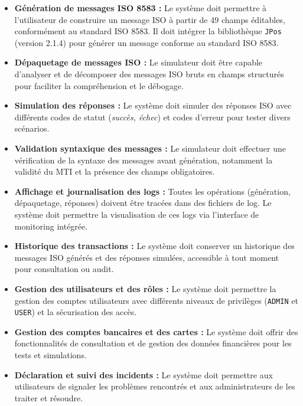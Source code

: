 \begin{itemize}[label=\textbullet]
    \item \textbf{Génération de messages ISO 8583 :} Le système doit permettre à l'utilisateur de construire un message ISO à partir de 49 champs éditables, conformément au standard ISO 8583. Il doit intégrer la bibliothèque \texttt{JPos} (version 2.1.4) pour générer un message conforme au standard ISO 8583.
    
    \item \textbf{Dépaquetage de messages ISO :} Le simulateur doit être capable d'analyser et de décomposer des messages ISO bruts en champs structurés pour faciliter la compréhension et le débogage.
    
    \item \textbf{Simulation des réponses :} Le système doit simuler des réponses ISO avec différents codes de statut (\textit{succès, échec}) et codes d'erreur pour tester divers scénarios.
    
    \item \textbf{Validation syntaxique des messages :} Le simulateur doit effectuer une vérification de la syntaxe des messages avant génération, notamment la validité du MTI et la présence des champs obligatoires.
    
    \item \textbf{Affichage et journalisation des logs :} Toutes les opérations (génération, dépaquetage, réponses) doivent être tracées dans des fichiers de log. Le système doit permettre la visualisation de ces logs via l'interface de monitoring intégrée.
    
    \item \textbf{Historique des transactions :} Le système doit conserver un historique des messages ISO générés et des réponses simulées, accessible à tout moment pour consultation ou audit.
    
    \item \textbf{Gestion des utilisateurs et des rôles :} Le système doit permettre la gestion des comptes utilisateurs avec différents niveaux de privilèges (\texttt{ADMIN} et \texttt{USER}) et la sécurisation des accès.
    
    \item \textbf{Gestion des comptes bancaires et des cartes :} Le système doit offrir des fonctionnalités de consultation et de gestion des données financières pour les tests et simulations.
    
    \item \textbf{Déclaration et suivi des incidents :} Le système doit permettre aux utilisateurs de signaler les problèmes rencontrés et aux administrateurs de les traiter et résoudre.
\end{itemize}




